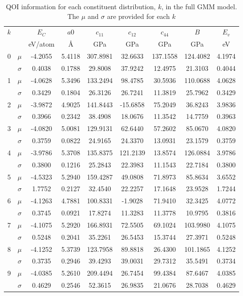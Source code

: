 \begin{table}[ht]
	\centering
	\caption{QOI information for each constituent distribution, $k$, in the full GMM model.  The $\mu$ and $\sigma$ are provided for each $k$}
  \label{tbl:sw_all_gmm_qois}
  \begin{tabular}{ccccccccc}
    \hline
    $k$ & & $E_C$ & $a0$ & $c_{11}$ & $c_{12}$ & $c_{44}$ & $B$ & $E_v$\\
        & & eV/atom & \AA & GPa & GPa & GPa & GPa & eV \\
    \hline
    0 & $\mu$     & -4.2055 & 5.4118 & 307.8981 & 32.6633 & 137.1558 & 124.4082 & 4.1974\\
     & $\sigma$   & 0.4038 & 0.1788 & 29.8008 & 37.9242 & 12.4975 & 21.3103 & 0.4044\\
    1 & $\mu$     & -4.0628 & 5.3496 & 133.2494 & 98.4785 & 30.5936 & 110.0688 & 4.0628\\
     & $\sigma$   & 0.3429 & 0.1804 & 26.3126 & 26.7241 & 11.3819 & 25.7962 & 0.3429\\
    2 & $\mu$     & -3.9872 & 4.9025 & 141.8443 & -15.6858 & 75.2049 & 36.8243 & 3.9836\\
     & $\sigma$   & 0.3966 & 0.2342 & 38.4908 & 18.0676 & 11.3542 & 14.7759 & 0.3963\\
    3 & $\mu$     & -4.0820 & 5.0081 & 129.9131 & 62.6440 & 57.2602 & 85.0670 & 4.0820\\
     & $\sigma$   & 0.3759 & 0.0822 & 24.9165 & 24.3370 & 13.0931 & 23.1579 & 0.3759\\
    4 & $\mu$     & -3.9786 & 5.3708 & 135.8375 & 121.2139 & 13.8574 & 126.0884 & 3.9786\\
     & $\sigma$   & 0.3800 & 0.1216 & 25.2843 & 22.3983 & 11.1543 & 22.7184 & 0.3800\\
    5 & $\mu$     & -4.5323 & 5.2940 & 159.4287 & 49.0808 & 71.8973 & 85.8634 & 3.6552\\
     & $\sigma$   & 1.7752 & 0.2127 & 32.4540 & 22.2257 & 17.1648 & 23.9528 & 1.7244\\
    6 & $\mu$     & -4.1263 & 4.7881 & 100.8331 & -1.9028 & 71.9410 & 32.3425 & 4.0772\\
     & $\sigma$   & 0.3745 & 0.0921 & 17.8274 & 11.3283 & 11.3778 & 10.9795 & 0.3816\\
    7 & $\mu$     & -4.1075 & 5.2920 & 166.8931 & 72.5505 & 69.1024 & 103.9980 & 4.1075\\
     & $\sigma$   & 0.5248 & 0.2041 & 35.2261 & 26.5453 & 15.3744 & 27.3971 & 0.5248\\
    8 & $\mu$     & -4.1252 & 5.3739 & 123.7958 & 89.8818 & 26.4300 & 101.1865 & 4.1252\\
     & $\sigma$   & 0.3735 & 0.2946 & 39.4293 & 39.0031 & 29.7312 & 35.5491 & 0.3734\\
    9 & $\mu$     & -4.0385 & 5.2610 & 209.4494 & 26.7454 & 99.4384 & 87.6467 & 4.0385\\
     & $\sigma$   & 0.4629 & 0.2546 & 52.3615 & 26.9835 & 21.0676 & 28.7038 & 0.4629\\
    \hline
  \end{tabular}
\end{table}

